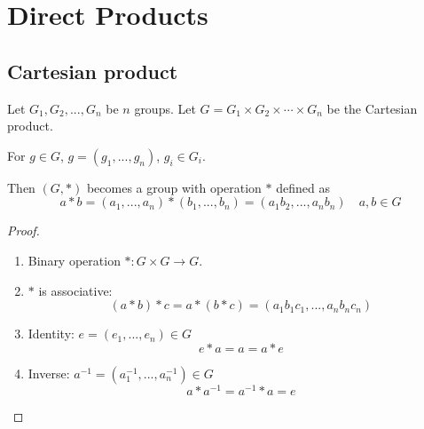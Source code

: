 \documentclass[11pt]{elegantbook}
\begin{document}
\section{Direct Products}
\subsection{Cartesian product}
Let $G_1,G_2,...,G_n$ be $n$ groups. Let $G=G_1\times G_2\times\cdots\times G_n$ be the Cartesian product.

For $g\in G$, $g=(g_1,...,g_n)$, $g_i\in G_i$.

\begin{theorem}
Then $(G,*)$ becomes a group with operation $*$ defined as
$$a*b=(a_1,...,a_n)*(b_1,...,b_n)=(a_1b_2,...,a_nb_n)\quad a,b\in G$$
\end{theorem}
\begin{proof}
    \quad

\begin{enumerate}[(1)]
    \item Binary operation $*:G\times G \rightarrow	G$.
    \item $*$ is associative: $$(a*b)*c=a*(b*c)=(a_1b_1c_1,...,a_nb_nc_n)$$
    \item Identity: $e=(e_1,...,e_n)\in G$ $$e*a=a=a*e$$
    \item Inverse: $a^{-1}=(a_1^{-1},...,a_n^{-1})\in G$ $$a*a^{-1}=a^{-1}*a=e$$
\end{enumerate}
\end{proof}
\end{document}
